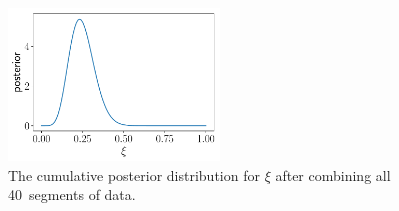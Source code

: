 \begin{figure}[htbp!]
\begin{center}
\includegraphics[width=0.5\textwidth]{Figures/posterior_xi}
\caption{The cumulative posterior distribution for $\xi$ after 
combining all 40~segments of data.}
\label{f:posterior_xi}
\end{center}
\end{figure}

